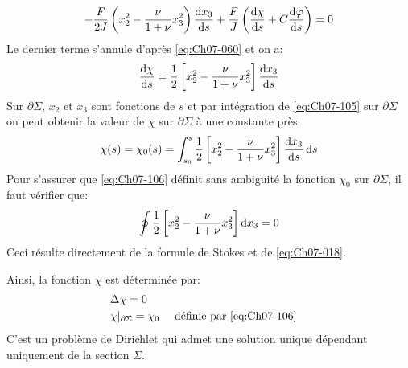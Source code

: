 \begin{displaymath}
    -\frac{F}{2J} \left( x_2^2 - \frac{\nu}{1+\nu} x_3^2 \right) \frac{\mathop{\mathrm{{}d}}\mathopen{} x_3}{\mathop{\mathrm{{}d}}\mathopen{} s} + \frac{F}{J} \left( \frac{\mathop{\mathrm{{}d}}\mathopen{} \chi}{\mathop{\mathrm{{}d}}\mathopen{} s} + C \frac{\mathop{\mathrm{{}d}}\mathopen{} \varphi}{\mathop{\mathrm{{}d}}\mathopen{} s} \right) = 0
\end{displaymath}
Le dernier terme s'annule d'après \eqref{eq:Ch07-060} et on a: 
\begin{equation}
    \frac{\mathop{\mathrm{{}d}}\mathopen{} \chi}{\mathop{\mathrm{{}d}}\mathopen{} s} = \frac{1}{2} \left[ x_2^2 - \frac{\nu}{1+\nu} x_3^2 \right] \frac{\mathop{\mathrm{{}d}}\mathopen{} x_3}{\mathop{\mathrm{{}d}}\mathopen{} s}
    \label{eq:Ch07-105}
\end{equation}
Sur $\partial \Sigma$, $x_2$ et $x_3$ sont fonctions de $s$ et par intégration de \eqref{eq:Ch07-105} sur $\partial \Sigma$ on peut obtenir la valeur de $\chi$ sur $\partial \Sigma$ à une constante près:
\begin{equation}
    \chi(s) = \chi_0 (s) = \int_{s_0}^s \frac{1}{2} \left[ x_2^2 - \frac{\nu}{1+\nu} x_3^2 \right] \frac{\mathop{\mathrm{{}d}}\mathopen{} x_3}{\mathop{\mathrm{{}d}}\mathopen{} s} \mathop{\mathrm{{}d}}\mathopen{} s
    \label{eq:Ch07-106}
\end{equation}
Pour s'assurer que \eqref{eq:Ch07-106} définit sans ambiguité la fonction $\chi_0$ sur $\partial \Sigma$, il faut vérifier que: 
\begin{equation}
    \oint \frac{1}{2} \left[ x_2^2 - \frac{\nu}{1+\nu} x_3^2 \right]\mathop{\mathrm{{}d}}\mathopen{} x_3 = 0
    \label{eq:Ch07-107}
\end{equation}
Ceci résulte directement de la formule de Stokes et de \eqref{eq:Ch07-018}. 

Ainsi, la fonction $\chi$ est déterminée par: 
\begin{equation}
    \begin{aligned}
        &\Delta\chi = 0 \\
        &\chi|_{\partial \Sigma} = \chi_0 && \text{ définie par \eqref{eq:Ch07-106}}
    \end{aligned}
    \label{eq:Ch07-108}
\end{equation}
C'est un problème de Dirichlet qui admet une solution unique dépendant uniquement de la section $\Sigma$.

